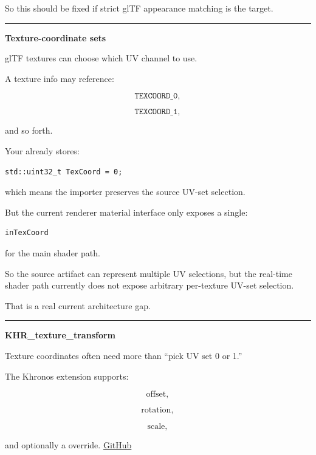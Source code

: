 So this should be fixed if strict glTF appearance matching is the target.

\begin{center}\rule{0.5\linewidth}{0.5pt}\end{center}

\textbf{Texture-coordinate sets}

glTF textures can choose which UV channel to use.

A texture info may reference:

\[
\texttt{TEXCOORD\_0},
\]

\[
\texttt{TEXCOORD\_1},
\]

and so forth.

Your  already stores:

\begin{verbatim}
std::uint32_t TexCoord = 0;
\end{verbatim}

which means the importer preserves the source UV-set selection.

But the current renderer material interface only exposes a single:

\begin{verbatim}
inTexCoord
\end{verbatim}

for the main shader path.

So the source artifact can represent multiple UV selections, but the real-time shader path currently does not expose arbitrary per-texture UV-set selection.

That is a real current architecture gap.

\begin{center}\rule{0.5\linewidth}{0.5pt}\end{center}

\textbf{KHR\_texture\_transform}

Texture coordinates often need more than ``pick UV set 0 or 1.''

The Khronos  extension supports:

\[
\text{offset},
\]

\[
\text{rotation},
\]

\[
\text{scale},
\]

and optionally a  override. \href{https://github.com/KhronosGroup/glTF/blob/main/extensions/2.0/Khronos/KHR_texture_transform/README.md?utm_source=chatgpt.com}{GitHub}

